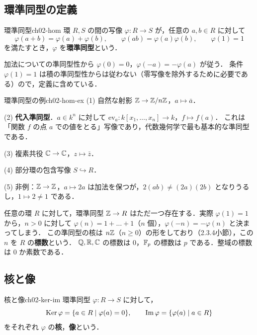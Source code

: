 \subsection{環準同型の定義}

\begin{mydef}{環準同型}{ch02-hom}
環 $R,S$ の間の写像 $\varphi:R\to S$ が，任意の $a,b\in R$ に対して
\[
  \varphi(a+b)=\varphi(a)+\varphi(b),\qquad \varphi(ab)=\varphi(a)\varphi(b),\qquad \varphi(1)=1
\]
を満たすとき，$\varphi$ を\textbf{環準同型}という．
\end{mydef}

加法についての準同型性から $\varphi(0)=0$，$\varphi(-a)=-\varphi(a)$ が従う．
条件 $\varphi(1)=1$ は積の準同型性からは従わない（零写像を除外するために必要である）ので，定義に含めている．

\begin{myex}{環準同型の例}{ch02-hom-ex}
(1) 自然な射影 $\mathbb{Z}\to\mathbb{Z}/n\mathbb{Z}$，$a\mapsto\bar a$．

(2) \textbf{代入準同型}．$a\in k^n$ に対して $\mathrm{ev}_a:k[x_1,\dots,x_n]\to k$，$f\mapsto f(a)$．
これは「関数 $f$ の点 $a$ での値をとる」写像であり，代数幾何学で最も基本的な準同型である．

(3) 複素共役 $\mathbb{C}\to\mathbb{C}$，$z\mapsto\bar z$．

(4) 部分環の包含写像 $S\hookrightarrow R$．

(5) 非例：$\mathbb{Z}\to\mathbb{Z}$，$a\mapsto2a$ は加法を保つが，$2(ab)\ne(2a)(2b)$ となりうるし，$1\mapsto2\ne1$ である．
\end{myex}

任意の環 $R$ に対して，環準同型 $\mathbb{Z}\to R$ はただ一つ存在する．実際 $\varphi(1)=1$ から，$n>0$ に対して
$\varphi(n)=1+\dots+1$（$n$ 個），$\varphi(-n)=-\varphi(n)$ と決まってしまう．
この準同型の核は $n\mathbb{Z}$（$n\ge0$）の形をしており（2.3.4小節），この $n$ を $R$ の\textbf{標数}という．
$\mathbb{Q},\mathbb{R},\mathbb{C}$ の標数は $0$，$\mathbb{F}_p$ の標数は $p$ である．整域の標数は $0$ か素数である．

\subsection{核と像}

\begin{mydef}{核と像}{ch02-ker-im}
環準同型 $\varphi:R\to S$ に対して，
\[
  \operatorname{Ker}\varphi=\{a\in R\mid\varphi(a)=0\},\qquad \operatorname{Im}\varphi=\{\varphi(a)\mid a\in R\}
\]
をそれぞれ $\varphi$ の\textbf{核}，\textbf{像}という．
\end{mydef}

